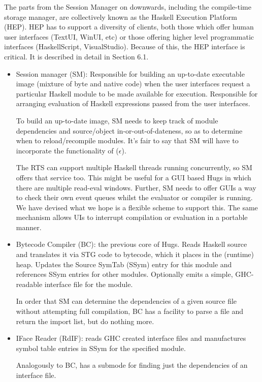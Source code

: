 The parts from the Session Manager on downwards, including the 
compile-time storage manager, are collectively known as the
Haskell Execution Platform (HEP).  HEP has to support a diversity
of clients, both those which offer human user interfaces (TextUI,
WinUI, etc) or those offering higher level programmatic interfaces
(HaskellScript, VisualStudio).  Because of this, the HEP interface
is critical.  It is described in detail in Section 6.1.
\begin{itemize}
\item
  Session manager (SM): Responsible for building an up-to-date
  executable image (mixture of byte and native code) when the user
  interfaces request a particular Haskell module to be made available
  for execution.  Responsible for arranging
  evaluation of Haskell expressions passed from the user interfaces.

  To build an up-to-date image, SM needs to keep track of module
  dependencies and source/object in-or-out-of-dateness, so as to
  determine when to reload/recompile modules.
  It's fair to say that SM will have to
  incorporate the functionality of ($\epsilon$).

  The RTS can support multiple Haskell threads running concurrently,
  so SM offers that service too.  This might be useful for a GUI based
  Hugs in which there are multiple read-eval windows.  Further, SM
  needs to offer GUIs a way to check their own event queues whilst the
  evaluator or compiler is running.  We have devised what we hope is a
  flexible scheme to support this.  The same mechanism allows UIs to
  interrupt compilation or evaluation in a portable manner.
\item
  Bytecode Compiler (BC): the previous core of Hugs.  Reads Haskell
  source and translates it via STG code to bytecode, which it places
  in the (runtime) heap.  Updates the Source SymTab (SSym) entry for
  this module and references SSym entries for other modules.
  Optionally emits a simple, GHC-readable interface file for the
  module.

  In order that SM can determine the dependencies of a given source
  file without attempting full compilation, BC has a facility to parse
  a file and return the import list, but do nothing more.

\item
  IFace Reader (RdIF): reads GHC created interface files and
  manufactures symbol table entries in SSym for the specified module.

  Analogously to BC, has a submode for finding just the dependencies
  of an interface file.


\end{itemize}
